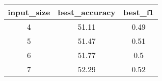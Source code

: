 \begin{tabular}{ccc}
	input\_size & best\_accuracy & best\_f1 \\\hline\hline
	4           & 51.11          & 0.49     \\
	5           & 51.47          & 0.51     \\
	6           & 51.77          & 0.5      \\
	7           & 52.29          & 0.52     \\
\end{tabular}